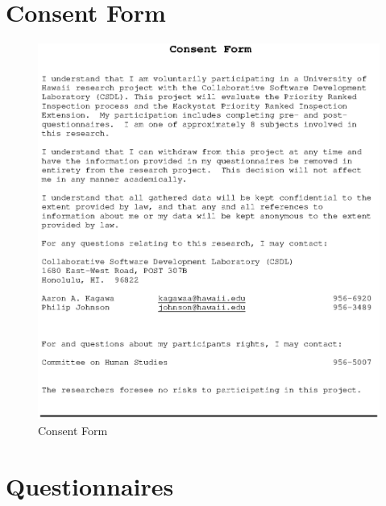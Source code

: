 
\appendix

\chapter{Consent Form}
\label{appendix:consent}
\begin{figure}[htbp]
  \centering
  \includegraphics[width=1.0\textwidth]{figs/ConsentForm_shrunk.eps}
  \caption{Consent Form}
  \label{fig:consent}
\end{figure}

\chapter{Questionnaires}
\label{appendix:questionnaire}

